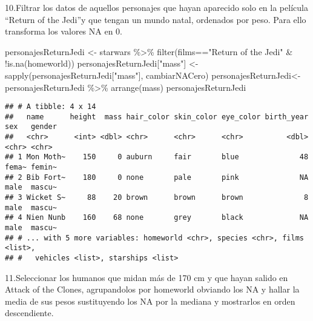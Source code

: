 \documentclass[
]{book}
\newenvironment{Shaded}{\begin{snugshade}}{\end{snugshade}}
\newcommand{\FunctionTok}[1]{\textcolor[rgb]{0.00,0.00,0.00}{#1}}
\newcommand{\NormalTok}[1]{#1}
\newcommand{\OtherTok}[1]{\textcolor[rgb]{0.56,0.35,0.01}{#1}}
\newcommand{\SpecialCharTok}[1]{\textcolor[rgb]{0.00,0.00,0.00}{#1}}
\newcommand{\StringTok}[1]{\textcolor[rgb]{0.31,0.60,0.02}{#1}}
\begin{document}
10.Filtrar los datos de aquellos personajes que hayan aparecido solo en la película ``Return of the Jedi''y que tengan un mundo natal, ordenados por peso. Para ello transforma los valores NA en 0.

\begin{Shaded}
\begin{Highlighting}[]
\NormalTok{personajesReturnJedi }\OtherTok{\textless{}{-}}\NormalTok{ starwars }\SpecialCharTok{\%\textgreater{}\%} \FunctionTok{filter}\NormalTok{(films}\SpecialCharTok{==}\StringTok{"Return of the Jedi"} \SpecialCharTok{\&} \SpecialCharTok{!}\FunctionTok{is.na}\NormalTok{(homeworld))}
\NormalTok{personajesReturnJedi[}\StringTok{"mass"}\NormalTok{] }\OtherTok{\textless{}{-}} \FunctionTok{sapply}\NormalTok{(personajesReturnJedi[}\StringTok{"mass"}\NormalTok{], cambiarNACero)}
\NormalTok{personajesReturnJedi}\OtherTok{\textless{}{-}}\NormalTok{ personajesReturnJedi }\SpecialCharTok{\%\textgreater{}\%} \FunctionTok{arrange}\NormalTok{(mass)}
\NormalTok{personajesReturnJedi}
\end{Highlighting}
\end{Shaded}

\begin{verbatim}
## # A tibble: 4 x 14
##   name      height  mass hair_color skin_color eye_color birth_year sex   gender
##   <chr>      <int> <dbl> <chr>      <chr>      <chr>          <dbl> <chr> <chr> 
## 1 Mon Moth~    150     0 auburn     fair       blue              48 fema~ femin~
## 2 Bib Fort~    180     0 none       pale       pink              NA male  mascu~
## 3 Wicket S~     88    20 brown      brown      brown              8 male  mascu~
## 4 Nien Nunb    160    68 none       grey       black             NA male  mascu~
## # ... with 5 more variables: homeworld <chr>, species <chr>, films <list>,
## #   vehicles <list>, starships <list>
\end{verbatim}

11.Seleccionar los humanos que midan más de 170 cm y que hayan salido en Attack of the Clones, agrupandolos por homeworld obviando los NA y hallar la media de sus pesos sustituyendo los NA por la mediana y mostrarlos en orden descendiente.
\end{document}
